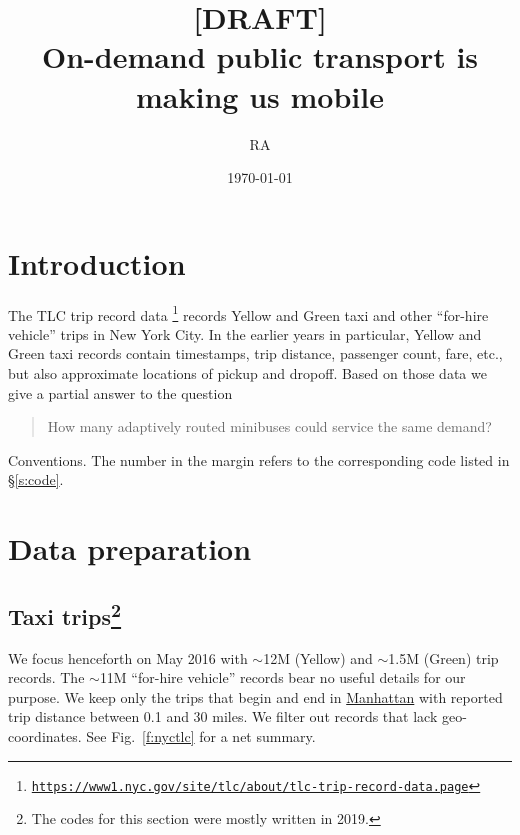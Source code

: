 \documentclass[12pt,notitlepage]{article}
\title{%
	[DRAFT]\\%
	On-demand public transport is making us mobile
}
\author{RA}
\date{\today}
\begin{document}
\maketitle

\section{Introduction}

The TLC trip record data%
\footnote{\href{https://www1.nyc.gov/site/tlc/about/tlc-trip-record-data.page}{\texttt{https://www1.nyc.gov/site/tlc/about/tlc-trip-record-data.page}}}
records 
Yellow and Green taxi
and other ``for-hire vehicle''
trips 
in New York City.
%
In the earlier years in particular,
Yellow and Green taxi records
contain timestamps,
trip distance, 
passenger count,
fare, etc.,
but also
approximate locations of pickup and dropoff.
%
%
Based on those data
we give a partial answer to the question
\begin{quote}
	How many adaptively routed minibuses could service the same demand?
\end{quote}

%



%

Conventions.
%
%
The number in the margin refers to the corresponding code listed in \S\ref{s:code}.


%

\section{Data preparation}

\subsection{Taxi trips\footnote{\label{f:oldcode}The codes for this section were mostly written in 2019.}}

\label{s:trips}

We focus henceforth on May 2016
with
$\sim$12M (Yellow) and $\sim$1.5M (Green)
trip records.
%
The $\sim$11M ``for-hire vehicle'' records
bear no useful details for our purpose.
%
%
%
We keep only 
the trips that begin and end in \href{https://www.openstreetmap.org/search?query=manhattan}{Manhattan}
with
reported trip distance between 0.1 and 30 miles.
%
We filter out records that
lack geo-coordinates.
%
%
See Fig.~\ref{f:nyctlc} for a net summary.
%
%
\end{document}
